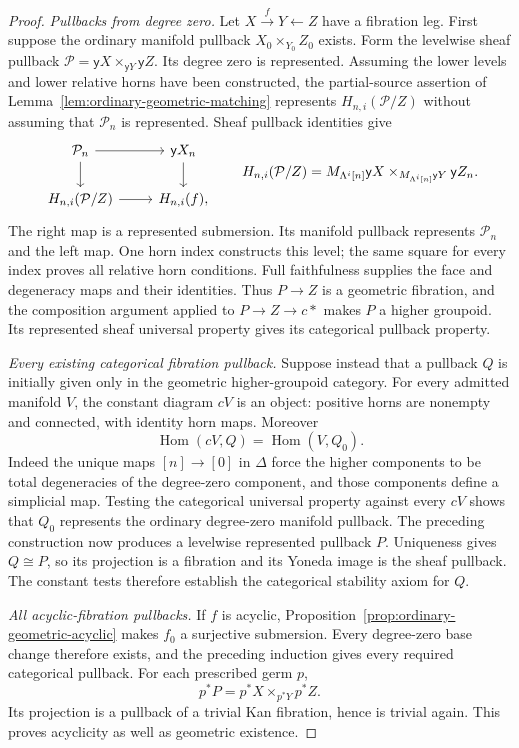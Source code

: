 \documentclass[12pt]{amsart}
\theoremstyle{definition}
\theoremstyle{remark}
\numberwithin{equation}{section}
\newcommand{\y}{\mathsf y}
\DeclareMathOperator{\Hom}{Hom}
\begin{document}
\begin{proof}
\emph{Pullbacks from degree zero.}
Let $X\xrightarrow{f}Y\leftarrow Z$ have a fibration leg.
First suppose the ordinary manifold pullback
$X_0\times_{Y_0}Z_0$ exists. Form the levelwise sheaf
pullback $\mathcal P=\y X\times_{\y Y}\y Z$.
Its degree zero is represented. Assuming the lower
levels and lower relative horns have been constructed,
the partial-source assertion of
Lemma~\ref{lem:ordinary-geometric-matching} represents
$H_{n,i}(\mathcal P/Z)$ without assuming that
$\mathcal P_n$ is represented. Sheaf pullback identities give
\[
\begin{tikzcd}
 \mathcal P_n\arrow[r]\arrow[d]
   &\y X_n\arrow[d]\\
 H_{n,i}(\mathcal P/Z)\arrow[r]
   &H_{n,i}(f),
\end{tikzcd}
\qquad
 H_{n,i}(\mathcal P/Z)
 =M_{\Lambda^i[n]}\y X
    \times_{M_{\Lambda^i[n]}\y Y}\y Z_n .
\]
The right map is a represented submersion. Its manifold
pullback represents $\mathcal P_n$ and the left map.
One horn index constructs this level; the same square for
every index proves all relative horn conditions.
Full faithfulness supplies the face and degeneracy maps
and their identities. Thus $P\to Z$ is a geometric
fibration, and the composition argument applied to
$P\to Z\to c*$ makes $P$ a higher groupoid.
Its represented sheaf universal property gives its
categorical pullback property.

\emph{Every existing categorical fibration pullback.}
Suppose instead that a pullback $Q$ is initially given
only in the geometric higher-groupoid category.
For every admitted manifold $V$, the constant diagram
$cV$ is an object: positive horns are nonempty and
connected, with identity horn maps. Moreover
\[
 \Hom(cV,Q)=\Hom(V,Q_0).
\]
Indeed the unique maps $[n]\to[0]$ in $\Delta$ force
the higher components to be total degeneracies of the
degree-zero component, and those components define
a simplicial map. Testing the categorical universal
property against every $cV$ shows that $Q_0$ represents
the ordinary degree-zero manifold pullback.
The preceding construction now produces a levelwise
represented pullback $P$. Uniqueness gives $Q\cong P$,
so its projection is a fibration and its Yoneda image
is the sheaf pullback. The constant tests therefore
establish the categorical stability axiom for $Q$.

\emph{All acyclic-fibration pullbacks.}
If $f$ is acyclic,
Proposition~\ref{prop:ordinary-geometric-acyclic} makes
$f_0$ a surjective submersion. Every degree-zero base
change therefore exists, and the preceding induction
gives every required categorical pullback.
For each prescribed germ $p$,
\[
 p^*P=p^*X\times_{p^*Y}p^*Z.
\]
Its projection is a pullback of a trivial Kan fibration,
hence is trivial again. This proves acyclicity as well
as geometric existence.


\end{proof}
\end{document}
